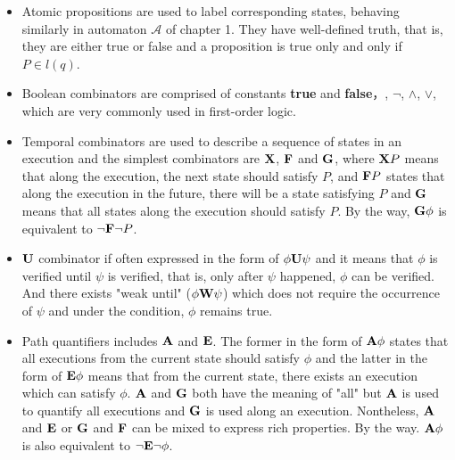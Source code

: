 \documentclass[11pt, conference]{IEEEtran}
\begin{document}
    \begin{itemize}
      \item Atomic propositions are used to label corresponding states, behaving similarly in automaton $\mathcal{A}$ of chapter 1. They have well-defined truth, that is, they are either true or false and a proposition is true only and only if $P \in l(q)$.
      \item Boolean combinators are comprised of constants \textbf{true} and \textbf{false}，, $\neg$, $\wedge$, $\vee$, which are very commonly used in first-order logic.
      \item Temporal combinators are used to describe a sequence of states in an execution and the simplest combinators are $\text{\textbf{X}}$, $\text{\textbf{F}}$ and $\text{\textbf{G}}$, where $\text{\textbf{X}}P$ means that along the execution, the next state should satisfy $P$, and $\text{\textbf{F}}P$ states that along the execution in the future, there will be a state satisfying $P$ and $\text{\textbf{G}}$ means that all states along the execution should satisfy $P$. By the way, $\text{\textbf{G}}\phi$ is equivalent to $\neg\text{\textbf{F}}\neg P$.
      \item $\text{\textbf{U}}$ combinator if often expressed in the form of $\phi \text{\textbf{U}} \psi$ and it means that $\phi$ is verified until $\psi$ is verified, that is, only after $\psi$ happened, $\phi$ can be verified. And there exists "weak until" ($\phi \text{\textbf{W}}\psi$) which does not require the occurrence of $\psi$ and under the condition, $\phi$ remains true.
      \item Path quantifiers includes $\text{\textbf{A}}$ and $\text{\textbf{E}}$. The former in the form of $\text{\textbf{A}}\phi$ states that all executions from the current state should satisfy $\phi$ and the latter in the form of $\text{\textbf{E}}\phi$ means that from the current state, there exists an execution which can satisfy $\phi$. $\text{\textbf{A}}$ and $\text{\textbf{G}}$ both have the meaning of "all" but $\text{\textbf{A}}$ is used to quantify all executions and $\text{\textbf{G}}$ is used along an execution. Nontheless, $\text{\textbf{A}}$ and $\text{\textbf{E}}$ or $\text{\textbf{G}}$ and $\text{\textbf{F}}$ can be mixed to express rich properties. By the way. $\text{\textbf{A}}\phi$ is also equivalent to $\neg\text{\textbf{E}}\neg\phi$.
    \end{itemize}
    
\end{document}
